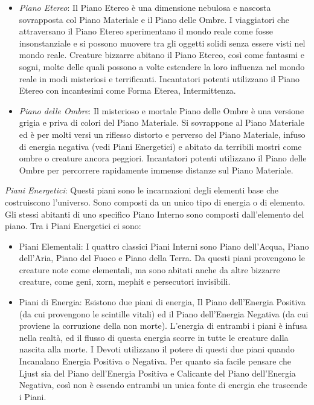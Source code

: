\documentclass[a4paper,twoside,openany]{book}
\begin{document}
\begin{multicols}{2}
\begin{itemize}[leftmargin=*]
	\item
	\emph{Piano Etereo}: Il Piano Etereo è una dimensione nebulosa e nascosta sovrapposta col Piano Materiale e il Piano delle Ombre. I viaggiatori che attraversano il Piano Etereo sperimentano il mondo reale come fosse insonstanziale e si possono muovere tra gli oggetti solidi senza essere visti nel mondo reale. Creature bizzarre abitano il Piano Etereo, così come fantasmi e sogni, molte delle quali possono a volte estendere la loro influenza nel mondo reale in modi misteriosi e terrificanti. Incantatori potenti utilizzano il Piano Etereo con incantesimi come Forma Eterea, Intermittenza.
	
	\item
	\emph{Piano delle Ombre}: Il misterioso e mortale Piano delle Ombre è una versione grigia e priva di colori del Piano Materiale. Si sovrappone al Piano Materiale ed è per molti versi un riflesso distorto e perverso del Piano Materiale, infuso di energia negativa (vedi Piani Energetici) e abitato da terribili mostri come ombre o creature ancora peggiori. Incantatori potenti utilizzano il Piano delle Ombre per percorrere rapidamente immense distanze sul Piano Materiale.
\end{itemize}

\medskip

\emph{Piani Energetici}: Questi piani sono le incarnazioni degli elementi base che costruiscono l'universo. Sono composti da un unico tipo di energia o di elemento. Gli stessi abitanti di uno specifico Piano Interno sono composti dall'elemento del piano. Tra i Piani Energetici ci sono:

\medskip

\begin{itemize}[leftmargin=*] \setlength{\itemsep}{0pt}
	\item
	Piani Elementali: I quattro classici Piani Interni sono Piano dell'Acqua, Piano dell'Aria, Piano del Fuoco e Piano della Terra. Da questi piani provengono le creature note come elementali, ma sono abitati anche da altre bizzarre creature, come geni, xorn, mephit e persecutori invisibili.
	
	\item
	Piani di Energia: Esistono due piani di energia, Il Piano dell'Energia Positiva (da cui provengono le scintille vitali) ed il Piano dell'Energia Negativa (da cui proviene la corruzione della non morte). L'energia di entrambi i piani è infusa nella realtà, ed il flusso di questa energia scorre in tutte le creature dalla nascita alla morte. I Devoti utilizzano il potere di questi due piani quando Incanalano Energia Positiva o Negativa. Per quanto sia facile pensare che Ljust sia del Piano dell'Energia Positiva e Calicante del Piano dell'Energia Negativa, così non è essendo entrambi un unica fonte di energia che trascende i Piani.
	

\end{itemize}
\end{multicols}
\end{document}
